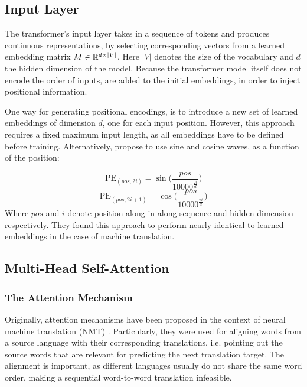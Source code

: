 \subsection{Input Layer}
The transformer's input layer takes in a sequence of tokens and produces continuous representations, by selecting corresponding vectors from a learned embedding matrix $M \in \mathbb{R}^{d \times |V|}$. Here $|V|$ denotes the size of the vocabulary and $d$ the hidden dimension of the model. Because the transformer model itself does not encode the order of inputs,  are added to the initial embeddings, in order to inject positional information.

One way for generating positional encodings, is to introduce a new set of learned embeddings of dimension $d$, one for each input position. However, this approach requires a fixed maximum input length, as all embeddings have to be defined before training. Alternatively, \cite{vaswani2017attention} propose to use sine and cosine waves, as a function of the position:

\begin{equation}
    \text{PE}_{(pos, 2i)} = \sin\bigg(\frac{pos}{10000^{\frac{2i}{d}}}\bigg)
\end{equation}
\begin{equation}
    \text{PE}_{(pos, 2i + 1)} = \cos\bigg(\frac{pos}{10000^{\frac{2i}{d}}}\bigg)
\end{equation}
Where $pos$ and $i$ denote position along in along sequence and hidden dimension respectively. They found this approach to perform nearly identical to learned embeddings in the case of machine translation.

\subsection{Multi-Head Self-Attention}
\subsubsection{The Attention Mechanism}
Originally, attention mechanisms have been proposed in the context of neural machine translation (NMT) \cite{bahdanau2014neural,luong2015effective}. Particularly, they were used for aligning words from a source language with their corresponding translations, i.e. pointing out the source words that are relevant for predicting the next translation target. The alignment is important, as different languages usually do not share the same word order, making a sequential word-to-word translation infeasible.


